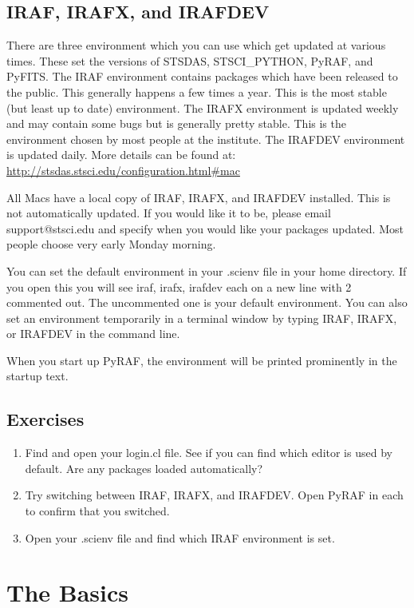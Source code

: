 \subsection{IRAF, IRAFX, and IRAFDEV}
There are three environment which you can use which get updated at various times. These set the versions of STSDAS, STSCI\_PYTHON, PyRAF, and PyFITS. The IRAF environment contains packages which have been released to the public. This generally happens a few times a year. This is the most stable (but least up to date) environment. The IRAFX environment is updated weekly and may contain some bugs but is generally pretty stable. This is the environment chosen by most people at the institute. The IRAFDEV environment is updated daily. More details can be found at: \href{http://stsdas.stsci.edu/configuration.html#mac}{http://stsdas.stsci.edu/configuration.html\#mac}

All Macs have a local copy of IRAF, IRAFX, and IRAFDEV installed. This is not automatically updated. If you would like it to be, please email support@stsci.edu and specify when you would like your packages updated. Most people choose very early Monday morning.

You can set the default environment in your .scienv file in your home directory. If you open this you will see iraf, irafx, irafdev each on a new line with 2 commented out. The uncommented one is your default environment. You can also set an environment temporarily in a terminal window by typing IRAF, IRAFX, or IRAFDEV in the command line.

When you start up PyRAF, the environment will be printed prominently in the startup text.

\subsection{Exercises}
\begin{enumerate}
\item Find and open your login.cl file.  See if you can find which editor is used by default. Are any packages loaded automatically? 
\item Try switching between IRAF, IRAFX, and IRAFDEV. Open PyRAF in each to confirm that you switched.
\item Open your .scienv file and find which IRAF environment is set.
\end{enumerate}

\section{The Basics}
